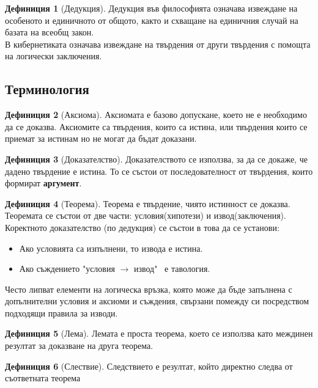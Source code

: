 \documentclass[fleqn, 12pt]{article}
\theoremstyle{definition}
\newtheorem{definition}{Дефиниция}[subsection]
\begin{document}
\begin{definition}[Дедукция]
Дедукция във философията означава извеждане на особеното и единичното от общото, както и схващане на единичния случай на базата на всеобщ закон. \\
В кибернетиката означава извеждане на твърдения от други твърдения с помощта на логически заключения.
\end{definition}

\subsection{Терминология}

\begin{definition}[Аксиома]
Аксиомата е базово допускане, което не е необходимо да се доказва. 
Аксиомите са твърдения, които са истина, или твърдения които се приемат за истинам но не могат да бъдат доказани. 
\end{definition}

\begin{definition}[Доказателство]
Доказателството се използва, за да се докаже, че дадено твърдение е истина. То се състои от последователност от твърдения, които формират \textbf{аргумент}.
\end{definition}

\begin{definition}[Теорема]
Теорема е твърдение, чиято истинност се доказва. \\
Теоремата се състои от две части: условия(хипотези) и  извод(заключения). \\
Коректното доказателство (по дедукция) се състои в това да се установи: 
\begin{itemize}
	\item Ако условията са изпълнени, то извода е истина.
	\item Ако съждението "условия $\to$ извод" \, е тавология.
\end{itemize}
Често липват елементи на логическа връзка, която може да бъде запълнена с допълнителни условия и аксиоми и съждения, свързани помежду си посредством подходящи правила за изводи. 
\end{definition}

\begin{definition}[Лема]
Лемата е проста теорема, което се използва като междинен резултат за доказване на друга теорема. 
\end{definition}

\begin{definition}[Слествие]
Следствието е резултат, който директно следва от съответната теорема
\end{definition}
\end{document}
